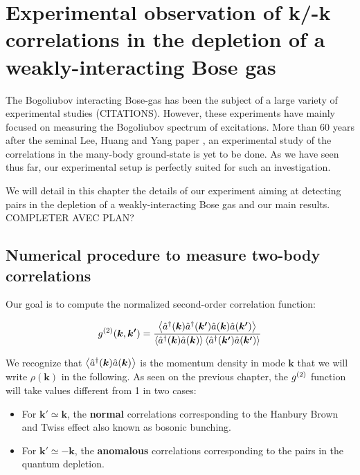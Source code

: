 \chapter{Experimental observation of k/-k correlations in the depletion of a weakly-interacting Bose gas}

The Bogoliubov interacting Bose-gas has been the subject of a large variety of experimental studies (CITATIONS). However, these experiments have mainly focused on measuring the Bogoliubov spectrum of excitations. More than 60 years after the seminal Lee, Huang and Yang paper \cite{lee1957}, an experimental study of the correlations in the many-body ground-state is yet to be done. As we have seen thus far, our experimental setup is perfectly suited for such an investigation. 

We will detail in this chapter the details of our experiment aiming at detecting \kmk pairs in the depletion of a weakly-interacting Bose gas and our main results. COMPLETER AVEC PLAN?

\section{Numerical procedure to measure two-body correlations}

Our goal is to compute the normalized second-order correlation function:

\begin{equation}
    g^{(2)} (\bm{k},\bm{k'}) = \frac{\left\langle\hat{a}^{\dagger}(\bm{k}) \hat{a}^{\dagger}(\bm{k'}) \hat{a}(\bm{k}) \hat{a}(\bm{k'})\right\rangle}{\left\langle\hat{a}^{\dagger}(\bm{k}) \hat{a}(\bm{k}) \right\rangle \left\langle\hat{a}^{\dagger}(\bm{k'}) \hat{a}(\bm{k'}) \right\rangle}
\end{equation}

We recognize that $\left\langle\hat{a}^{\dagger}(\bm{k}) \hat{a}(\bm{k})\right\rangle$ is the momentum density in mode $\bm{k}$ that we will write $\rho(\bm{k})$ in the following. As seen on the previous chapter, the $g^{(2)}$ function will take values different from 1 in two cases:

\begin{itemize}
    \item For $\bm{k'} \simeq \bm{k}$, the \textbf{normal} correlations corresponding to the Hanbury Brown and Twiss effect also known as bosonic bunching.
    \item For $\bm{k'} \simeq -\bm{k}$, the \textbf{anomalous} correlations corresponding to the \kmk pairs in the quantum depletion.
\end{itemize}

